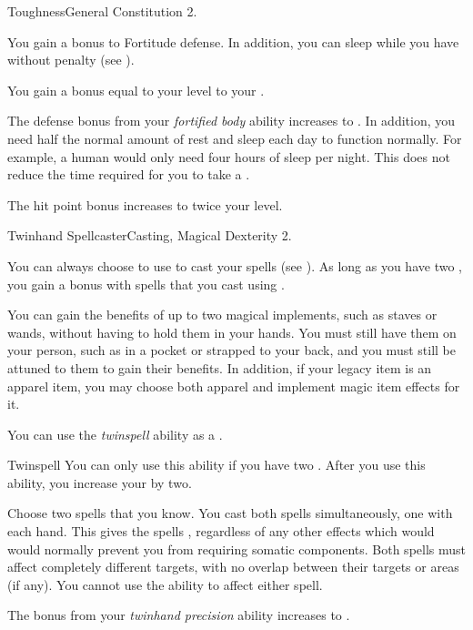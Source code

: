     \begin{feat}{Toughness}{General}
        \featpre Constitution 2.

         You gain a  bonus to Fortitude defense.
        In addition, you can sleep while you have  without penalty (see ).

         You gain a bonus equal to your level to your .

         The defense bonus from your \textit{fortified body} ability increases to .
        In addition, you need half the normal amount of rest and sleep each day to function normally.
        For example, a human would only need four hours of sleep per night.
        This does not reduce the time required for you to take a .

         The hit point bonus increases to twice your level.
    \end{feat}

    \begin{magicalfeat}{Twinhand Spellcaster}{Casting, Magical}
        \featpre Dexterity 2.

         You can always choose to use  to cast your spells (see ).
        As long as you have two , you gain a   bonus with spells that you cast using .

         You can gain the benefits of up to two magical implements, such as staves or wands, without having to hold them in your hands.
        You must still have them on your person, such as in a pocket or strapped to your back, and you must still be attuned to them to gain their benefits.
        In addition, if your legacy item is an apparel item, you may choose both apparel and implement magic item effects for it.

         You can use the \textit{twinspell} ability as a .
        \begin{magicalactiveability}{Twinspell}
            \rankline
            You can only use this ability if you have two .
            After you use this ability, you increase your  by two.

            Choose two spells that you know.
            You cast both spells simultaneously, one with each hand.
            This gives the spells , regardless of any other effects which would would normally prevent you from requiring somatic components.
            Both spells must affect completely different targets, with no overlap between their targets or areas (if any).
            You cannot use the  ability to affect either spell.
        \end{magicalactiveability}

         The bonus from your \textit{twinhand precision} ability increases to .
    \end{magicalfeat}

